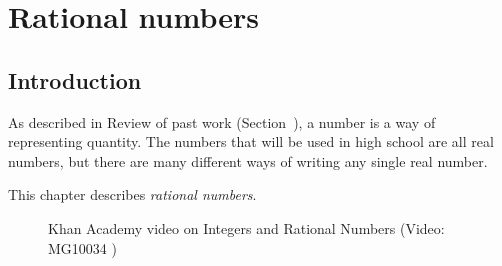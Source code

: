          \chapter{Rational numbers}
    \setcounter{figure}{1}
    \setcounter{subfigure}{1}
    \label{m38348}
    \section{ Introduction}
            \nopagebreak
      \label{m38348*id62184}As described in  Review of past work (Section~), a number is a way of representing quantity. The numbers that will be used in high school are all real numbers, but there are many different ways of writing any single real number.\par 
      \label{m38348*id62191}This chapter describes \textsl{rational numbers}.\par \label{m38348*eip-195}
    \setcounter{subfigure}{0}
	\begin{figure}[H] %
    \textnormal{Khan Academy video on Integers and Rational Numbers}\vspace{.1in} \nopagebreak
  \label{m38348*yt-media1}\label{m38348*yt-video1}
             { (Video:  MG10034 )}
      \vspace{2pt}
    \vspace{.1in}
 \end{figure}       \par 
